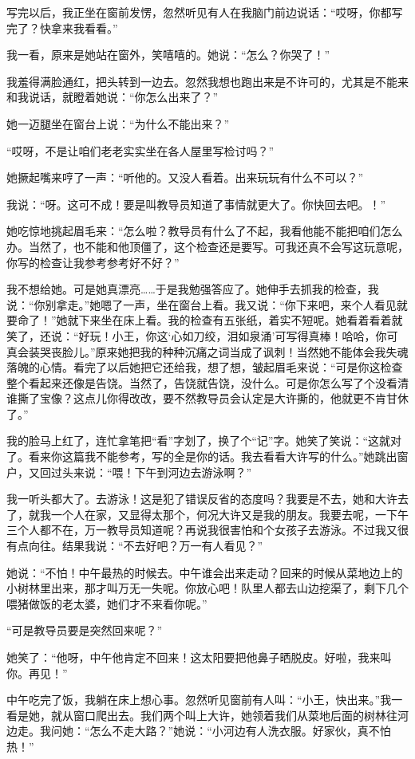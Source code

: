 写完以后，我正坐在窗前发愣，忽然听见有人在我脑门前边说话：“哎呀，你都写完了？快拿来我看看。” 

我一看，原来是她站在窗外，笑嘻嘻的。她说：“怎么？你哭了！” 

我羞得满脸通红，把头转到一边去。忽然我想也跑出来是不许可的，尤其是不能来和我说话，就瞪着她说：“你怎么出来了？” 

她一迈腿坐在窗台上说：“为什么不能出来？” 

“哎呀，不是让咱们老老实实坐在各人屋里写检讨吗？” 

她撅起嘴来哼了一声：“听他的。又没人看着。出来玩玩有什么不可以？” 

我说：“呀。这可不成！要是叫教导员知道了事情就更大了。你快回去吧。！” 

她吃惊地挑起眉毛来：“怎么啦？教导员有什么了不起，我看他能不能把咱们怎么办。当然了，也不能和他顶僵了，这个检查还是要写。可我还真不会写这玩意呢，你写的检查让我参考参考好不好？” 

我不想给她。可是她真漂亮……于是我勉强答应了。她伸手去抓我的检查，我说：“你别拿走。”她嗯了一声，坐在窗台上看。我又说：“你下来吧，来个人看见就要命了！”她就下来坐在床上看。我的检查有五张纸，着实不短呢。她看着看着就笑了，还说：“好玩！小王，你这‘心如刀绞，泪如泉涌’可写得真棒！哈哈，你可真会装哭丧脸儿。”原来她把我的种种沉痛之词当成了讽刺！当然她不能体会我失魂落魄的心情。看完了以后她把它还给我，想了想，皱起眉毛来说：“可是你这检查整个看起来还像是告饶。当然了，告饶就告饶，没什么。可是你怎么写了个没看清谁撕了宝像？这点儿你得改改，要不然教导员会认定是大许撕的，他就更不肯甘休了。” 

我的脸马上红了，连忙拿笔把“看”字划了，换了个“记”字。她笑了笑说：“这就对了。看来你这篇我不能参考，写的全是你的话。我去看看大许写的什么。”她跳出窗户，又回过头来说：“喂！下午到河边去游泳啊？” 

我一听头都大了。去游泳！这是犯了错误反省的态度吗？我要是不去，她和大许去了，就我一个人在家，又显得太那个，何况大许又是我的朋友。我要去呢，一下午三个人都不在，万一教导员知道呢？再说我很害怕和个女孩子去游泳。不过我又很有点向往。结果我说：“不去好吧？万一有人看见？” 

她说：“不怕！中午最热的时候去。中午谁会出来走动？回来的时候从菜地边上的小树林里出来，那才叫万无一失呢。你放心吧！队里人都去山边挖渠了，剩下几个喂猪做饭的老太婆，她们才不来看你呢。” 

“可是教导员要是突然回来呢？” 

她笑了：“他呀，中午他肯定不回来！这太阳要把他鼻子晒脱皮。好啦，我来叫你。再见！” 

中午吃完了饭，我躺在床上想心事。忽然听见窗前有人叫：“小王，快出来。”我一看是她，就从窗口爬出去。我们两个叫上大许，她领着我们从菜地后面的树林往河边走。我问她：“怎么不走大路？”她说：“小河边有人洗衣服。好家伙，真不怕热！” 

